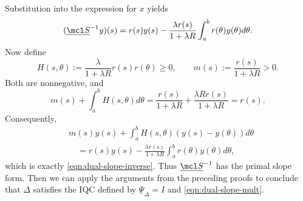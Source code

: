 Substitution into the expression for $x$ yields
\begin{equation}\label{eqn:dual-slope-inverse}
    (\underline{\mcl S}^{-1}y)(s)
    =r(s)y(s)-\frac{\lambda r(s)}{1+\lambda R}
    \int_a^b r(\theta)y(\theta)d\theta.
\end{equation}
Now define
\begin{equation*}
    H(s,\theta):=\frac{\lambda}{1+\lambda R}r(s)r(\theta)\geq0,\qquad
    m(s):=\frac{r(s)}{1+\lambda R}>0.
\end{equation*}
Both are nonnegative, and
\begin{equation*}
    m(s)+\int_a^bH(s,\theta)d\theta
    =\frac{r(s)}{1+\lambda R}
    +\frac{\lambda Rr(s)}{1+\lambda R}=r(s).
\end{equation*}
Consequently,
\begin{align*}
&m(s)y(s)+\int_a^bH(s,\theta)(y(s)-y(\theta))d\theta\\
&\quad=r(s)y(s)-\frac{\lambda r(s)}{1+\lambda R}
\int_a^b r(\theta)y(\theta)d\theta,
\end{align*}
which is exactly \eqref{eqn:dual-slope-inverse}. Thus
$\underline{\mcl S}^{-1}$ has the primal slope form. Then we can apply the arguments from the preceding
proofs to conclude that $\Delta$ satisfies the IQC defined by $\underline{\Psi}_\Delta = I$ and \eqref{eqn:dual-slope-mult}.
